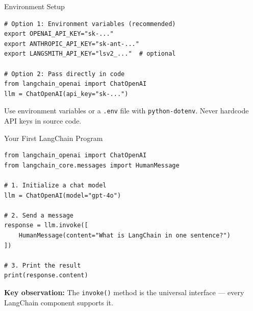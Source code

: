 \documentclass[aspectratio=169,11pt]{beamer}
\begin{document}
\begin{frame}[fragile]{Environment Setup}

\begin{codebox}
\begin{lstlisting}
# Option 1: Environment variables (recommended)
export OPENAI_API_KEY="sk-..."
export ANTHROPIC_API_KEY="sk-ant-..."
export LANGSMITH_API_KEY="lsv2_..."  # optional

# Option 2: Pass directly in code
from langchain_openai import ChatOpenAI
llm = ChatOpenAI(api_key="sk-...")
\end{lstlisting}
\end{codebox}

\vspace{0.15cm}

\begin{tipbox}
Use environment variables or a \texttt{.env} file with \texttt{python-dotenv}. Never hardcode API keys in source code.
\end{tipbox}
\end{frame}

\begin{frame}[fragile]{Your First LangChain Program}

\begin{codebox}
\begin{lstlisting}
from langchain_openai import ChatOpenAI
from langchain_core.messages import HumanMessage

# 1. Initialize a chat model
llm = ChatOpenAI(model="gpt-4o")

# 2. Send a message
response = llm.invoke([
    HumanMessage(content="What is LangChain in one sentence?")
])

# 3. Print the result
print(response.content)
\end{lstlisting}
\end{codebox}

\vspace{0.1cm}
\textbf{Key observation:} The \texttt{invoke()} method is the universal interface --- every LangChain component supports it.
\end{frame}
\end{document}

